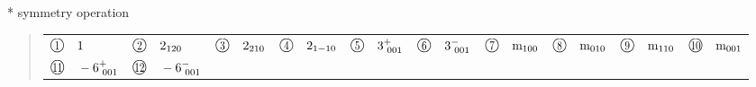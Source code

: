 \documentclass[fleqn,10pt,landscape]{jsarticle}
\begin{document}
* symmetry operation
\begin{quote}
\begin{tabular}{llllllllll}
$ {\ooalign{\hfil\resizebox{.8\width}{\height}{1}\hfil\crcr\raise.1ex\hbox{\large$\bigcirc$}}}\quad 1 $ & $ {\ooalign{\hfil\resizebox{.8\width}{\height}{2}\hfil\crcr\raise.1ex\hbox{\large$\bigcirc$}}}\quad 2{}_{120} $ & $ {\ooalign{\hfil\resizebox{.8\width}{\height}{3}\hfil\crcr\raise.1ex\hbox{\large$\bigcirc$}}}\quad 2{}_{210} $ & $ {\ooalign{\hfil\resizebox{.8\width}{\height}{4}\hfil\crcr\raise.1ex\hbox{\large$\bigcirc$}}}\quad 2{}_{1-10} $ & $ {\ooalign{\hfil\resizebox{.8\width}{\height}{5}\hfil\crcr\raise.1ex\hbox{\large$\bigcirc$}}}\quad 3^{+}_{\,\,001} $ & $ {\ooalign{\hfil\resizebox{.8\width}{\height}{6}\hfil\crcr\raise.1ex\hbox{\large$\bigcirc$}}}\quad 3^{-}_{\,\,001} $ & $ {\ooalign{\hfil\resizebox{.8\width}{\height}{7}\hfil\crcr\raise.1ex\hbox{\large$\bigcirc$}}}\quad {\rm m}_{100} $ & $ {\ooalign{\hfil\resizebox{.8\width}{\height}{8}\hfil\crcr\raise.1ex\hbox{\large$\bigcirc$}}}\quad {\rm m}_{010} $ & $ {\ooalign{\hfil\resizebox{.8\width}{\height}{9}\hfil\crcr\raise.1ex\hbox{\large$\bigcirc$}}}\quad {\rm m}_{110} $ & $ {\ooalign{\hfil\resizebox{.8\width}{\height}{10}\hfil\crcr\raise.1ex\hbox{\large$\bigcirc$}}}\quad {\rm m}_{001} $ \\
$ {\ooalign{\hfil\resizebox{.8\width}{\height}{11}\hfil\crcr\raise.1ex\hbox{\large$\bigcirc$}}}\quad -6^{+}_{\,\,001} $ & $ {\ooalign{\hfil\resizebox{.8\width}{\height}{12}\hfil\crcr\raise.1ex\hbox{\large$\bigcirc$}}}\quad -6^{-}_{\,\,001} $ & $  $ & $  $ & $  $ & $  $ & $  $ & $  $ & $  $ & $  $
\end{tabular}
\end{quote}
\end{document}
